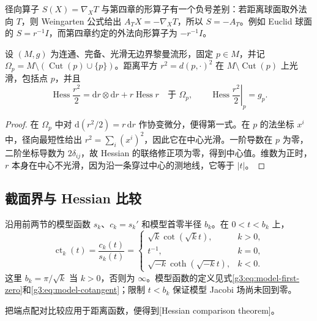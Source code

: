 \ProseParagraphBreak

径向算子 \(S(X)=\nabla_XT\) 与第四章的形算子有一个负号差别：若距离球面取外法向 \(T\)，则 Weingarten 公式给出 \(A_TX=-\nabla_XT\)，所以 \(S=-A_T\)。例如 Euclid 球面的 \(S=r^{-1}I\)，而第四章约定的外法向形算子为 \(-r^{-1}I\)。

\begin{proposition}\label{g3:prop:distance-square-hessian}
	设 \((M,g)\) 为连通、完备、光滑无边界黎曼流形，固定 \(p\in M\)，并记 \(\Omega_p=M\setminus(\operatorname{Cut}(p)\cup\{p\})\)。距离平方 \(r^2=d(p,\cdot)^2\) 在 \(M\setminus\operatorname{Cut}(p)\) 上光滑，包括点 \(p\)，并且
	\begin{equation}\label{g3:eq:distance-square-hessian}
		\operatorname{Hess}\frac{r^2}{2}
		=\mathrm dr\otimes\mathrm dr+r\operatorname{Hess}r
		\quad\text{于 }\Omega_p,\qquad
		\left.\operatorname{Hess}\frac{r^2}{2}\right|_p=g_p.
	\end{equation}
\end{proposition}
\begin{proof}
	在 \(\Omega_p\) 中对 \(\mathrm d(r^2/2)=r\,\mathrm dr\) 作协变微分，便得第一式。在 \(p\) 的法坐标 \(x^i\) 中，径向最短性给出
	\(r^2=\sum_i(x^i)^2\)，因此它在中心光滑。一阶导数在 \(p\) 为零，二阶坐标导数为 \(2\delta_{ij}\)，故 Hessian 的联络修正项为零，得到中心值。维数为正时，\(r\) 本身在中心不光滑，因为沿一条穿过中心的测地线，它等于 \(|t|\)。
\end{proof}

\subsection{截面界与 Hessian 比较}
\label{g3:subsec:0703:02}

沿用前两节的模型函数 \(s_k\)、\(c_k=s_k'\) 和模型首零半径 \(b_k\)。在 \(0<t<b_k\) 上，
\[
	\operatorname{ct}_k(t)=\frac{c_k(t)}{s_k(t)}
	=
	\begin{cases}
		\sqrt{k}\cot(\sqrt{k}t),&k>0,\\
		t^{-1},&k=0,\\
		\sqrt{-k}\coth(\sqrt{-k}t),&k<0.
	\end{cases}
\]
这里 \(b_k=\pi/\sqrt{k}\) 当 \(k>0\)，否则为 \(\infty\)。模型函数的定义见式\eqref{g3:eq:model-first-zero}和\eqref{g3:eq:model-cotangent}；限制 \(t<b_k\) 保证模型 Jacobi 场尚未回到零。

把端点配对比较应用于距离函数，便得到[Hessian comparison theorem]。

